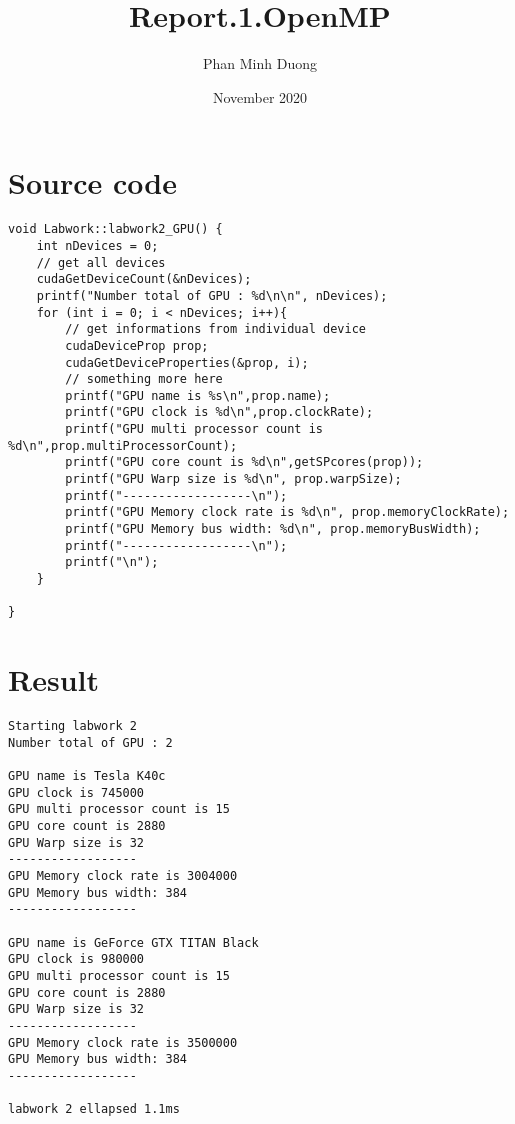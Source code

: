 \documentclass{article}
\title{Report.1.OpenMP}
\author{Phan Minh Duong}
\date{November 2020}
\begin{document}
\maketitle

\section{Source code}
\begin{verbatim}
void Labwork::labwork2_GPU() {
    int nDevices = 0;
    // get all devices
    cudaGetDeviceCount(&nDevices);
    printf("Number total of GPU : %d\n\n", nDevices);
    for (int i = 0; i < nDevices; i++){
        // get informations from individual device
        cudaDeviceProp prop;
        cudaGetDeviceProperties(&prop, i);
        // something more here
        printf("GPU name is %s\n",prop.name);
        printf("GPU clock is %d\n",prop.clockRate);
        printf("GPU multi processor count is %d\n",prop.multiProcessorCount);
        printf("GPU core count is %d\n",getSPcores(prop));
        printf("GPU Warp size is %d\n", prop.warpSize);
        printf("------------------\n");
        printf("GPU Memory clock rate is %d\n", prop.memoryClockRate);
        printf("GPU Memory bus width: %d\n", prop.memoryBusWidth);
        printf("------------------\n");
        printf("\n");
    }

}
\end{verbatim}
\section{Result}
\begin{verbatim}
Starting labwork 2
Number total of GPU : 2

GPU name is Tesla K40c
GPU clock is 745000
GPU multi processor count is 15
GPU core count is 2880
GPU Warp size is 32
------------------
GPU Memory clock rate is 3004000
GPU Memory bus width: 384
------------------

GPU name is GeForce GTX TITAN Black
GPU clock is 980000
GPU multi processor count is 15
GPU core count is 2880
GPU Warp size is 32
------------------
GPU Memory clock rate is 3500000
GPU Memory bus width: 384
------------------

labwork 2 ellapsed 1.1ms
\end{verbatim}
\end{document}
